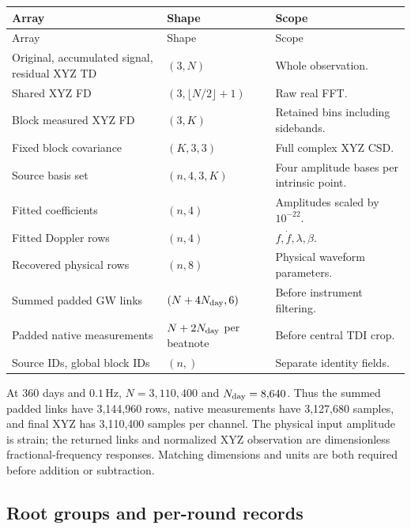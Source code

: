 \documentclass[11pt,a4paper]{article}
\newcommand{\Hz}{\,\mathrm{Hz}}
\begin{document}
{\small
\begin{longtable}{P{0.33\textwidth}P{0.25\textwidth}P{0.34\textwidth}}
\toprule Array & Shape & Scope\\\midrule\endfirsthead
\toprule Array & Shape & Scope\\\midrule\endhead
Original, accumulated signal, residual XYZ TD & \((3,N)\) & Whole observation.\\
Shared XYZ FD & \((3,\lfloor N/2\rfloor+1)\) & Raw real FFT.\\
Block measured XYZ FD & \((3,K)\) & Retained bins including sidebands.\\
Fixed block covariance & \((K,3,3)\) & Full complex XYZ CSD.\\
Source basis set & \((n,4,3,K)\) & Four amplitude bases per intrinsic point.\\
Fitted coefficients & \((n,4)\) & Amplitudes scaled by \(10^{-22}\).\\
Fitted Doppler rows & \((n,4)\) & \(f,\dot f,\lambda,\beta\).\\
Recovered physical rows & \((n,8)\) & Physical waveform parameters.\\
Summed padded GW links & \((N+4N_{\rm day},6)\) & Before instrument filtering.\\
Padded native measurements & \(N+2N_{\rm day}\) per beatnote & Before central TDI crop.\\
Source IDs, global block IDs & \((n,)\) & Separate identity fields.\\
\bottomrule
\end{longtable}}

At 360 days and \(0.1\Hz\), \(N=3{,}110{,}400\) and
\(N_{\rm day}=8{,}640\). Thus the summed padded links have 3,144,960 rows,
native measurements have 3,127,680 samples, and final XYZ has 3,110,400
samples per channel. The physical input amplitude is strain; the returned
links and normalized XYZ observation are dimensionless fractional-frequency
responses. Matching dimensions and units are both required before addition
or subtraction.

\subsection{Root groups and per-round records}
\end{document}

